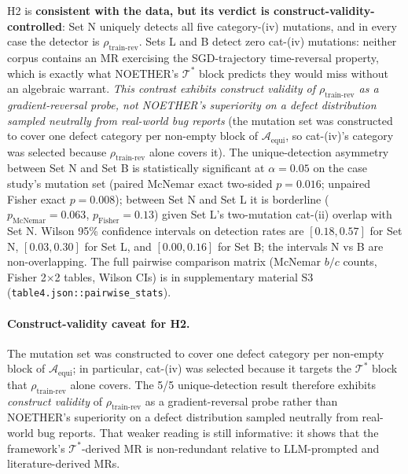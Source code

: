 \documentclass[acmsmall, screen]{acmart}
\begin{document}
H2 is \textbf{consistent with the data, but its verdict is construct-validity-controlled}: Set N uniquely detects all five category-(iv) mutations, and in every case the detector is $\rho_{\mathrm{train\text{-}rev}}$. Sets L and B detect zero cat-(iv) mutations: neither corpus contains an MR exercising the SGD-trajectory time-reversal property, which is exactly what NOETHER's $\mathcal{T}^{*}$ block predicts they would miss without an algebraic warrant. \emph{This contrast exhibits construct validity of $\rho_{\mathrm{train\text{-}rev}}$ as a gradient-reversal probe, not NOETHER's superiority on a defect distribution sampled neutrally from real-world bug reports} (the mutation set was constructed to cover one defect category per non-empty block of $\mathcal{A}_{\mathrm{equi}}$, so cat-(iv)'s category was selected because $\rho_{\mathrm{train\text{-}rev}}$ alone covers it). The unique-detection asymmetry between Set N and Set B is statistically significant at $\alpha = 0.05$ on the case study's mutation set (paired McNemar exact two-sided $p = 0.016$; unpaired Fisher exact $p = 0.008$); between Set N and Set L it is borderline ($p_\mathrm{McNemar} = 0.063$, $p_\mathrm{Fisher} = 0.13$) given Set L's two-mutation cat-(ii) overlap with Set N. Wilson 95\% confidence intervals on detection rates are $[0.18, 0.57]$ for Set N, $[0.03, 0.30]$ for Set L, and $[0.00, 0.16]$ for Set B; the intervals N vs B are non-overlapping. The full pairwise comparison matrix (McNemar $b/c$ counts, Fisher 2$\times$2 tables, Wilson CIs) is in supplementary material S3 (\texttt{table4.json::pairwise\_stats}).

\paragraph{Construct-validity caveat for H2.}
The mutation set was constructed to cover one defect category per non-empty block of $\mathcal{A}_{\mathrm{equi}}$; in particular, cat-(iv) was selected because it targets the $\mathcal{T}^*$ block that $\rho_{\mathrm{train\text{-}rev}}$ alone covers. The 5/5 unique-detection result therefore exhibits \emph{construct validity} of $\rho_{\mathrm{train\text{-}rev}}$ as a gradient-reversal probe rather than NOETHER's superiority on a defect distribution sampled neutrally from real-world bug reports. That weaker reading is still informative: it shows that the framework's $\mathcal{T}^*$-derived MR is non-redundant relative to LLM-prompted and literature-derived MRs.
\end{document}
